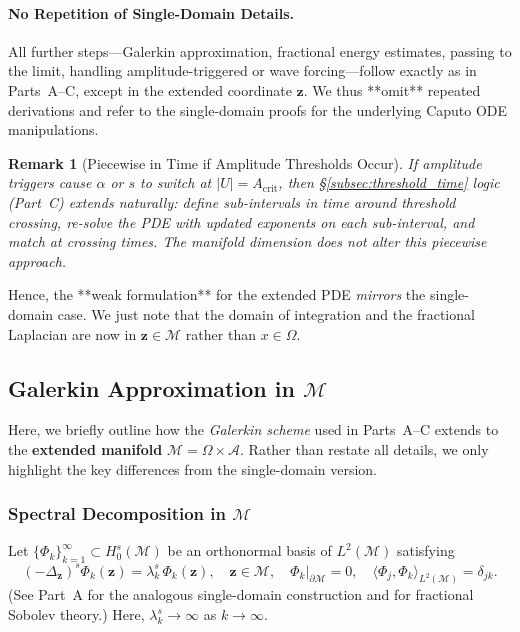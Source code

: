 \documentclass[12pt]{article}
\newtheorem{remark}[theorem]{Remark}
\begin{document}
\paragraph{No Repetition of Single-Domain Details.}
All further steps—Galerkin approximation, fractional energy estimates, passing to the limit, 
handling amplitude-triggered or wave forcing—follow exactly as in Parts~A--C, except in 
the extended coordinate \(\mathbf{z}\). We thus **omit** repeated derivations and 
refer to the single-domain proofs for the underlying Caputo ODE manipulations. 

\begin{remark}[Piecewise in Time if Amplitude Thresholds Occur]
If amplitude triggers cause $\alpha$ or $s$ to switch at $\lvert U\rvert=A_{\mathrm{crit}}$, 
then \S\ref{subsec:threshold_time} logic (Part~C) extends naturally: define sub-intervals in 
time around threshold crossing, re-solve the PDE with updated exponents on each sub-interval, 
and match at crossing times. The manifold dimension does not alter this piecewise approach.
\end{remark}

Hence, the **weak formulation** for the extended PDE \emph{mirrors} the single-domain 
case. We just note that the domain of integration and the fractional Laplacian are now 
in $\mathbf{z}\in\mathcal{M}$ rather than $x\in\Omega$.
\subsection{Galerkin Approximation in \texorpdfstring{\(\mathcal{M}\)}{M}}
\label{sec:galerkin_D}

Here, we briefly outline how the \emph{Galerkin scheme} used in Parts~A--C extends to the 
\textbf{extended manifold} \(\mathcal{M}=\Omega\times \mathcal{A}\). Rather than restate 
all details, we only highlight the key differences from the single-domain version. 

\subsubsection{Spectral Decomposition in \(\mathcal{M}\)}

Let \(\{\Phi_k\}_{k=1}^\infty\subset H_0^s(\mathcal{M})\) be an orthonormal basis of 
\(L^2(\mathcal{M})\) satisfying 
\[
(-\Delta_{\mathbf{z}})^s \Phi_k(\mathbf{z}) 
= 
\lambda_k^s \,\Phi_k(\mathbf{z}),
\quad
\mathbf{z}\in \mathcal{M},
\quad
\Phi_k\big|_{\partial\mathcal{M}}=0,
\quad
\langle \Phi_j,\Phi_k\rangle_{L^2(\mathcal{M})}=\delta_{jk}.
\]
(See Part~A for the analogous single-domain construction and \cite{DiNezzaPalatucciValdinoci} 
for fractional Sobolev theory.) Here, \(\lambda_k^s\to\infty\) as \(k\to\infty\).
\end{document}
